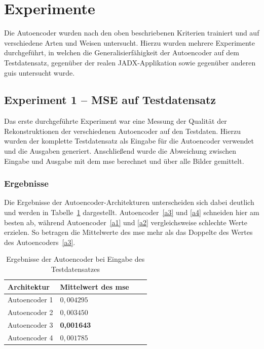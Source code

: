 \section{Experimente}
Die Autoencoder wurden nach den oben beschriebenen Kriterien trainiert und auf verschiedene Arten und Weisen untersucht. Hierzu wurden mehrere Experimente durchgeführt, in welchen die Generalisierfähigkeit der Autoencoder auf dem Testdatensatz, gegenüber der realen JADX-Applikation sowie gegenüber anderen \glspl{gui} untersucht wurde.

\subsection{Experiment 1 -- MSE auf Testdatensatz}
\label{subsec:exp1}

Das erste durchgeführte Experiment war eine Messung der Qualität der Rekonstruktionen der verschiedenen Autoencoder auf den Testdaten. Hierzu wurden der komplette Testdatensatz als Eingabe für die Autoencoder verwendet und die Ausgaben generiert. Anschließend wurde die Abweichung zwischen Eingabe und Ausgabe mit dem \gls{mse} berechnet und über alle Bilder gemittelt.

\subsubsection*{Ergebnisse}

Die Ergebnisse der Autoencoder-Architekturen unterscheiden sich dabei deutlich und werden in Tabelle~\ref{tab:exp1results} dargestellt.
Autoencoder~\ref{a3} und \ref{a4} schneiden hier am besten ab, während Autoencoder~\ref{a1} und \ref{a2} vergleichsweise schlechte Werte erzielen. So betragen die Mittelwerte des \gls{mse} mehr als das Doppelte des Wertes des Autoencoders~\ref{a3}.


\begin{table}[htbp]
    \centering
    \caption{Ergebnisse der Autoencoder bei Eingabe des Testdatensatzes }
    \label{tab:exp1results}
    \smallskip
    \begin{tabular}{ llll }
        \toprule
        Architektur & Mittelwert des \gls{mse} \\
        \hline
        Autoencoder 1 & $0,004295$ \\
        Autoencoder 2 & $0,003450$ \\
        Autoencoder 3 & \textbf{0,001643} \\
        Autoencoder 4 & $0,001785$ \\
        \bottomrule
    \end{tabular}
\end{table}


